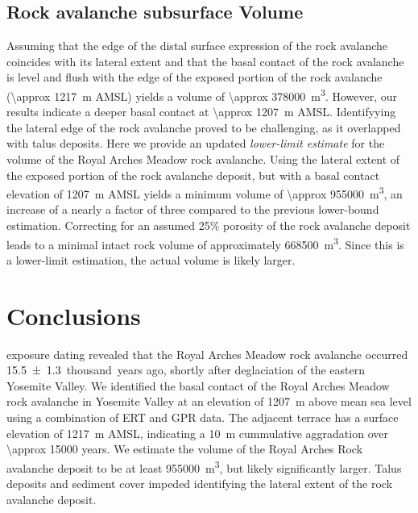 \documentclass[utf8]{frontiersSCNS}
\begin{document}
\subsection {Rock avalanche subsurface Volume}

Assuming that the edge of the distal surface expression of the rock avalanche coincides with its lateral extent and  that the basal contact of the rock avalanche is level and flush with the edge of the exposed portion of the rock avalanche (\SI{\approx 1217}{m} AMSL) yields a volume of \SI{\approx 378000}{m^3}. However, our results indicate a deeper basal contact at \SI{\approx 1207}{m} AMSL. Identifyying the lateral edge of the rock avalanche proved to be challenging, as it overlapped with talus deposits. Here we provide an updated \emph{lower-limit estimate} for the volume of the Royal Arches Meadow rock avalanche. Using the lateral extent of the exposed portion of the rock avalanche deposit, but with a basal contact elevation of \SI{1207}{m} AMSL yields a minimum volume of \SI{\approx 955000}{m^3}, an increase of a nearly a factor of three compared to the previous lower-bound estimation. Correcting for an assumed 25\% porosity of the rock avalanche deposit \cite[e.g.'][]{hutchinson2006massive, stock2010catastrophic} leads to a minimal intact rock volume of approximately \SI{668500}{m^3}. Since this is a lower-limit estimation, the actual volume is likely larger.


\section{Conclusions}\label{sec:conclusions}

 exposure dating revealed that the Royal Arches Meadow rock avalanche occurred \num{15.5+-1.3}~thousand~years ago, shortly after deglaciation of the eastern Yosemite Valley. We identified the basal contact of the Royal Arches Meadow rock avalanche in Yosemite Valley at an elevation of \SI{1207}{m} above mean sea level using a combination of ERT and GPR data. The adjacent terrace has a surface elevation of \SI{1217}{m} AMSL, indicating a \SI{10}{m} cummulative aggradation over \num{\approx 15000} years. We estimate the volume of the Royal Arches Rock avalanche deposit to be at least \SI{955000}{m^3}, but likely significantly larger. Talus deposits and sediment cover impeded identifying the lateral extent of the rock avalanche deposit. 
\end{document}
